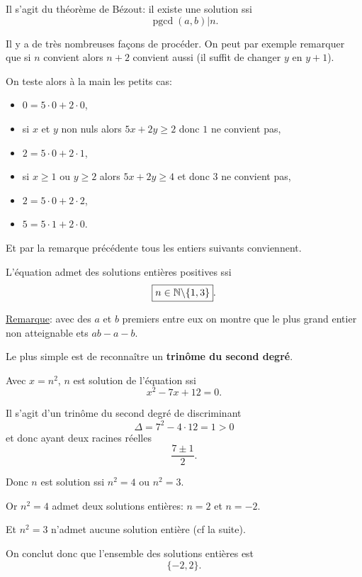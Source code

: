 \begin{sol}
  Il s'agit du théorème de Bézout: il existe une solution ssi
  $$\boxed{\operatorname{pgcd}(a,b) | n}.$$
\end{sol}

\begin{sol}
  Il y a de très nombreuses façons de procéder. On peut par exemple remarquer que si $n$ convient alors $n+2$ convient aussi (il suffit de changer $y$ en $y+1$).

  On teste alors à la main les petits cas:
  \begin{itemize}
    \item $0=5 \cdot 0 + 2 \cdot 0$,
    \item si $x$ et $y$ non nuls alors $5x+2y \geq 2$ donc $1$ ne convient pas,
    \item $2=5 \cdot 0 + 2 \cdot 1$,
    \item si $x\geq 1$ ou $y\geq 2$ alors $5x+2y \geq 4$ et donc $3$ ne convient pas,
    \item $2=5 \cdot 0 + 2 \cdot 2$,
    \item $5=5 \cdot 1 + 2 \cdot 0$.
  \end{itemize}

  Et par la remarque précédente tous les entiers suivants conviennent.

  L'équation admet des solutions entières positives ssi
  $$\boxed{n \in \mathbb N \backslash \{1,3\}}.$$

  \underline{Remarque}: avec des $a$ et $b$ premiers entre eux on montre que le plus grand entier non atteignable ets $ab-a-b$.
\end{sol}


\begin{sol}
  Le plus simple est de reconnaître un \textbf{trinôme du second degré}.

  Avec $x = n^2$, $n$ est solution de l'équation ssi
  $$x^2-7x+12 = 0.$$

  Il s'agit d'un trinôme du second degré de discriminant
  $$\Delta = 7^2 - 4 \cdot 12 = 1 > 0$$
  et donc ayant deux racines réelles
  $$\frac{7 \pm 1}{2}.$$

  Donc $n$ est solution ssi $n^2 = 4$ ou $n^2 = 3$.

  Or $n^2 = 4$ admet deux solutions entières: $n=2$ et $n=-2$.

  Et $n^2 = 3$ n'admet aucune solution entière (cf la suite).


  On conclut donc que l'ensemble des solutions entières est
  $$\boxed{\{-2,2\}}.$$
\end{sol}

